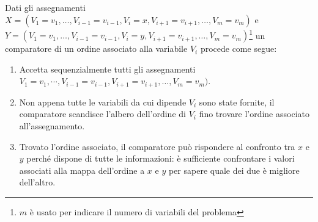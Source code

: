 Dati gli assegnamenti $X=(V_1=v_1, \dots, V_{i-1}=v_{i-1}, V_i=x,
V_{i+1}=v_{i+1}, \dots, V_m=v_m)$ e $Y=(V_1=v_1, \dots,
V_{i-1}=v_{i-1}, V_i=y, V_{i+1}=v_{i+1}, \dots, V_m=v_m)$\footnote{$m$
  è usato per indicare il numero di variabili del problema} un
comparatore di un ordine associato alla variabile $V_i$ procede come
segue:
\begin{enumerate}
\item Accetta sequenzialmente tutti gli assegnamenti $V_1=v_1, \cdots,
  V_{i-1}=v_{i-1}, V_{i+1}=v_{i+1}, \dots, V_m=v_m)$.
\item Non appena tutte le variabili da cui dipende $V_i$ sono state
  fornite, il comparatore scandisce l'albero dell'ordine di $V_i$ fino
  trovare l'ordine associato all'assegnamento.
\item Trovato l'ordine associato, il comparatore può rispondere al
  confronto tra $x$ e $y$ perché dispone di tutte le informazioni: è
  sufficiente confrontare i valori associati alla mappa dell'ordine a
  $x$ e $y$ per sapere quale dei due è migliore dell'altro.
\end{enumerate}